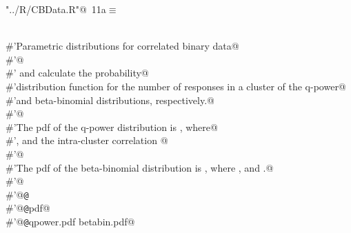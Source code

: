 \documentclass[reqno]{amsart}
\renewcommand{\NWtarget}[2]{\hypertarget{#1}{#2}}
\begin{document}
\begin{flushleft} \small
\begin{minipage}{\linewidth}\label{scrap16}\raggedright\small
\NWtarget{nuweb11a}{} \verb@"../R/CBData.R"@\nobreak\ {\footnotesize {11a}}$\equiv$
\vspace{-1ex}
\begin{list}{}{} \item
\mbox{}\verb@@\\
\mbox{}\verb@#'Parametric distributions for correlated binary data@\\
\mbox{}\verb@#'@\\
\mbox{}\verb@#' and  calculate the probability@\\
\mbox{}\verb@#'distribution function for the number of responses in a cluster of the q-power@\\
\mbox{}\verb@#'and beta-binomial distributions, respectively.@\\
\mbox{}\verb@#'@\\
\mbox{}\verb@#'The pdf of the q-power distribution is  , where@\\
\mbox{}\verb@#', and the intra-cluster correlation @\\
\mbox{}\verb@#'@\\
\mbox{}\verb@#'The pdf of the beta-binomial distribution is  , where , and .@\\
\mbox{}\verb@#'@\\
\mbox{}\verb@#'@{\tt @}\verb@export@\\
\mbox{}\verb@#'@{\tt @}\verb@name pdf@\\
\mbox{}\verb@#'@{\tt @}\verb@aliases qpower.pdf betabin.pdf@\\

\end{list}
\end{minipage}
\end{flushleft}
\end{document}
